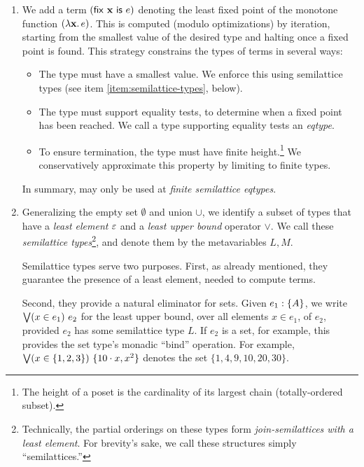 \begin{enumerate}
\item We add a term $(\mathsf{fix}~{\mathbf{x}}~\mathsf{is}~{e})$ denoting the least fixed point of the
  monotone function $(\lambda\mathbf{x}.\, e)$. This is computed (modulo
  optimizations) by iteration, starting from the smallest value of the desired
  type and halting once a fixed point is found. This strategy constrains the
  types of  terms in several ways:
  \begin{itemize}
  \item The type must have a smallest value. We enforce this using semilattice
    types (see item \ref{item:semilattice-types}, below).

  \item The type must support equality tests, to determine when a fixed point
    has been reached. We call a type supporting equality tests an \emph{eqtype}.

  \item To ensure termination, the type must have finite height.\footnote{The
    height of a poset is the cardinality of its largest chain (totally-ordered
    subset).} We conservatively approximate this property by limiting 
    to finite types.
  \end{itemize}

  In summary,  may only be used at \emph{finite semilattice eqtypes}.



\item\label{item:semilattice-types} Generalizing the empty set $\emptyset$ and
  union $\cup$, we identify a subset of types that have a \emph{least element}
  $\varepsilon$ and a \emph{least upper bound} operator $\vee$. We call these
  \emph{semilattice types}\footnote{Technically, the partial orderings on these
    types form \emph{join-semilattices with a least element}. For brevity's
    sake, we call these structures simply ``semilattices.''}, and denote them by
  the metavariables $L,M$.

  Semilattice types serve two purposes. First, as already mentioned, they
  guarantee the presence of a least element, needed to compute  terms.


  Second, they provide a natural eliminator for sets. Given $e_1 : \{A\}$, we
  write $\textstyle\bigvee({x \in e_1})\ {e_2}$ for the least upper bound, over all elements $x
  \in e_1$, of $e_2$, provided $e_2$ has some semilattice type $L$. If $e_2$ is
  a set, for example, this provides the set type's monadic ``bind'' operation.
  For example, $\textstyle\bigvee({x \in \{1,2,3\}})\  \{10 \cdot x, x^2\}$ denotes the
  set $\{1, 4, 9, 10, 20, 30\}$.

\end{enumerate}
